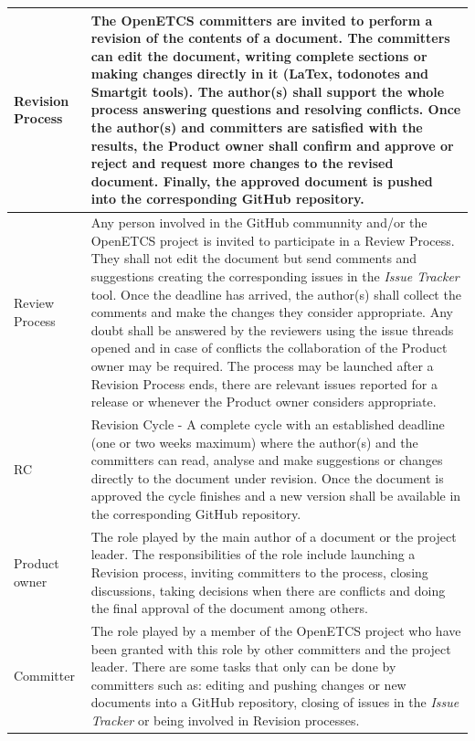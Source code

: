 \documentclass{template/openetcs_article}
\begin{document}
\begin{supertabular}{|m{3cm}m{11cm}|}
\hline
Revision Process &
The OpenETCS committers are invited to perform a revision of the contents of a document. The committers can edit the document, writing complete sections or making changes directly in it (LaTex, todonotes and Smartgit tools). The author(s) shall support the whole process answering questions and resolving conflicts. Once the author(s) and committers are satisfied with the results, the Product owner shall confirm and approve or reject and request more changes to the revised document. Finally, the approved document is pushed into the corresponding GitHub repository.
\\\hline
Review Process &
Any person involved in the GitHub communnity and/or the OpenETCS project is invited to participate in a Review Process. They shall not edit the document but send comments and suggestions creating the corresponding issues in the {\it Issue Tracker} tool. Once the deadline has arrived, the author(s) shall collect the comments and make the changes they consider appropriate. Any doubt shall be answered by the reviewers using the issue threads opened and in case of conflicts the collaboration of the Product owner may be required. The process may be launched after a Revision Process ends, there are relevant issues reported for a release or whenever the Product owner considers appropriate. 
\\\hline
RC &
Revision Cycle - A complete cycle with an established deadline (one or two weeks maximum) where the author(s) and the committers can read, analyse and make suggestions or changes directly to the document under revision. Once the document is approved the cycle finishes and a new version shall be available in the corresponding GitHub repository.
\\\hline
Product owner &
The role played by the main author of a document or the project leader. The responsibilities of the role include launching a Revision process, inviting committers to the process, closing discussions, taking decisions when there are conflicts and doing the final approval of the document among others.
\\\hline
Committer &
The role played by a member of the OpenETCS project who have been granted with this role by other committers and the project leader. There are some tasks that only can be done by committers such as: editing and pushing changes or new documents into a GitHub repository, closing of issues in the {\it Issue Tracker} or being involved in Revision processes.
   
\end{supertabular}
\end{document}
